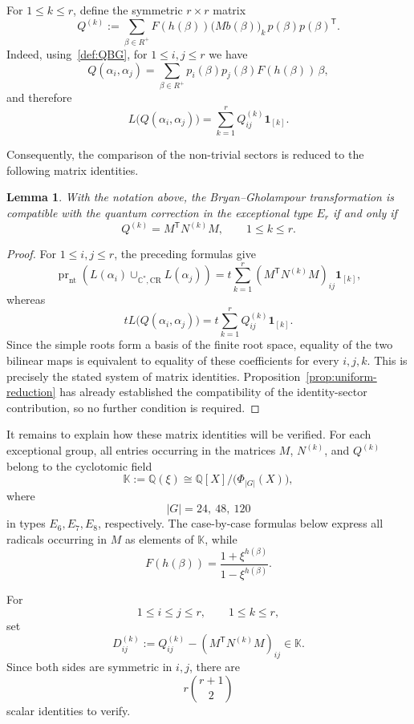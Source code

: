 \documentclass[a4paper,reqno]{amsart}
\theoremstyle{plain} %
\newtheorem{lmm}[thm]{Lemma}
\theoremstyle{definition} %
\theoremstyle{remark} %
\newcommand{\1}{\mathds{1}}   %
\begin{document}
For \(1\le k\le r\), define the symmetric \(r\times r\) matrix
\[
Q^{(k)}
:=
\sum_{\beta\in R^+}
F(h(\beta))
\bigl(Mb(\beta)\bigr)_k
\,p(\beta)p(\beta)^{\mathsf T}.
\]
Indeed, using~\eqref{def:QBG}, for \(1\le i,j\le r\) we have
\[
Q(\alpha_i,\alpha_j)
=
\sum_{\beta\in R^+}
p_i(\beta)p_j(\beta)
F(h(\beta))\,\beta,
\]
and therefore
\[
L\bigl(Q(\alpha_i,\alpha_j)\bigr)
=
\sum_{k=1}^r
Q_{ij}^{(k)}\mathbf 1_{[k]}.
\]

Consequently, the comparison of the non-trivial sectors is reduced to
the following matrix identities.

\begin{lmm}
\label{lmm:exceptional-matrix-criterion}
With the notation above, the Bryan--Gholampour transformation is
compatible with the quantum correction in the exceptional type \(E_r\)
if and only if
\[
Q^{(k)}
=
M^{\mathsf T}N^{(k)}M,
\qquad
1\le k\le r.
\]
\end{lmm}

\begin{proof}
For \(1\le i,j\le r\), the preceding formulas give
\[
\operatorname{pr}_{\mathrm{nt}}
\left(
L(\alpha_i)
\cup_{\mathbb C^*,\mathrm{CR}}
L(\alpha_j)
\right)
=
t\sum_{k=1}^r
\left(M^{\mathsf T}N^{(k)}M\right)_{ij}
\mathbf 1_{[k]},
\]
whereas
\[
tL\bigl(Q(\alpha_i,\alpha_j)\bigr)
=
t\sum_{k=1}^r
Q_{ij}^{(k)}\mathbf 1_{[k]}.
\]
Since the simple roots form a basis of the finite root space, equality
of the two bilinear maps is equivalent to equality of these coefficients
for every \(i,j,k\).  This is precisely the stated system of matrix
identities.  Proposition~\ref{prop:uniform-reduction} has already established the compatibility
of the identity-sector contribution, so no further condition is
required.
\end{proof}

It remains to explain how these matrix identities will be verified.
For each exceptional group, all entries occurring in the matrices
\(M\), \(N^{(k)}\), and \(Q^{(k)}\) belong to the cyclotomic field
\[
\mathbb K
:=
\mathbb Q(\xi)
\cong
\mathbb Q[X]/\bigl(\Phi_{|G|}(X)\bigr),
\]
where
\[
|G|=24,\ 48,\ 120
\]
in types \(E_6,E_7,E_8\), respectively.  The case-by-case formulas below
express all radicals occurring in \(M\) as elements of \(\mathbb K\),
while
\[
F(h(\beta))
=
\frac{1+\xi^{h(\beta)}}{1-\xi^{h(\beta)}}.
\]

For
\[
1\le i\le j\le r,
\qquad
1\le k\le r,
\]
set
\[
D_{ij}^{(k)}
:=
Q_{ij}^{(k)}
-
\left(M^{\mathsf T}N^{(k)}M\right)_{ij}
\in\mathbb K.
\]
Since both sides are symmetric in \(i,j\), there are
\[
r\binom{r+1}{2}
\]
scalar identities to verify.
\end{document}
